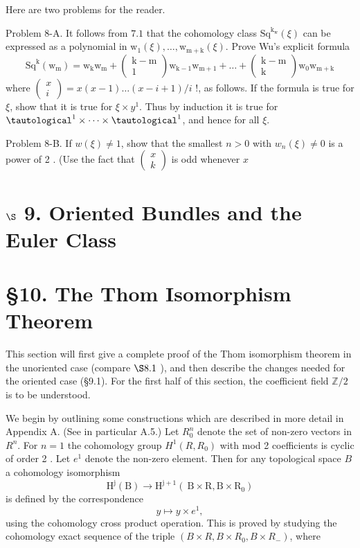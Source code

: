 \documentclass[10pt]{article}
\begin{document}
Here are two problems for the reader.

Problem 8-A. It follows from $7.1$ that the cohomology class $\mathrm{Sq}^{\mathrm{k}_{\mathrm{w}}}(\xi)$ can be expressed as a polynomial in $\mathrm{w}_{1}(\xi), \ldots, \mathrm{w}_{\mathrm{m}+\mathrm{k}}(\xi)$. Prove Wu's explicit formula
$$
\mathrm{Sq}^{\mathrm{k}}\left(\mathrm{w}_{\mathrm{m}}\right)=\mathrm{w}_{\mathrm{k}} \mathrm{w}_{\mathrm{m}}+\left(\begin{array}{c}
\mathrm{k}-\mathrm{m} \\
1
\end{array}\right) \mathrm{w}_{\mathrm{k}-1} \mathrm{w}_{\mathrm{m}+1}+\ldots+\left(\begin{array}{c}
\mathrm{k}-\mathrm{m} \\
\mathrm{k}
\end{array}\right) \mathrm{w}_{0} \mathrm{w}_{\mathrm{m}+\mathrm{k}}
$$
where $\left(\begin{array}{c}x \\ i\end{array}\right)=x(x-1) \ldots(x-i+1) / i$ !, as follows. If the formula is true for $\xi$, show that it is true for $\xi \times y^{1}$. Thus by induction it is true for $\tautological^{1} \times \cdots \times \tautological^{1}$, and hence for all $\xi$.

Problem 8-B. If $w(\xi) \neq 1$, show that the smallest $n>0$ with $w_{n}(\xi) \neq 0$ is a power of 2 . (Use the fact that $\left(\begin{array}{l}x \\ k\end{array}\right)$ is odd whenever $x$

\section{$\S$ 9. Oriented Bundles and the Euler Class}


\section{§10. The Thom Isomorphism Theorem}
This section will first give a complete proof of the Thom isomorphism theorem in the unoriented case (compare $\S 8.1$ ), and then describe the changes needed for the oriented case (§9.1). For the first half of this section, the coefficient field $\mathbb{Z} / 2$ is to be understood.

We begin by outlining some constructions which are described in more detail in Appendix A. (See in particular A.5.) Let $R_{0}^{n}$ denote the set of non-zero vectors in $R^{n}$. For $n=1$ the cohomology group $H^{1}\left(R, R_{0}\right)$ with mod 2 coefficients is cyclic of order 2 . Let $e^{1}$ denote the non-zero element. Then for any topological space $B$ a cohomology isomorphism
$$
\mathrm{H}^{\mathrm{j}}(\mathrm{B}) \rightarrow \mathrm{H}^{\mathrm{j}+1}\left(\mathrm{~B} \times \mathrm{R}, \mathrm{B} \times \mathrm{R}_{0}\right)
$$
is defined by the correspondence
$$
y \mapsto y \times e^{1},
$$
using the cohomology cross product operation. This is proved by studying the cohomology exact sequence of the triple $\left(B \times R, B \times R_{0}, B \times R_{-}\right)$, where
\end{document}
